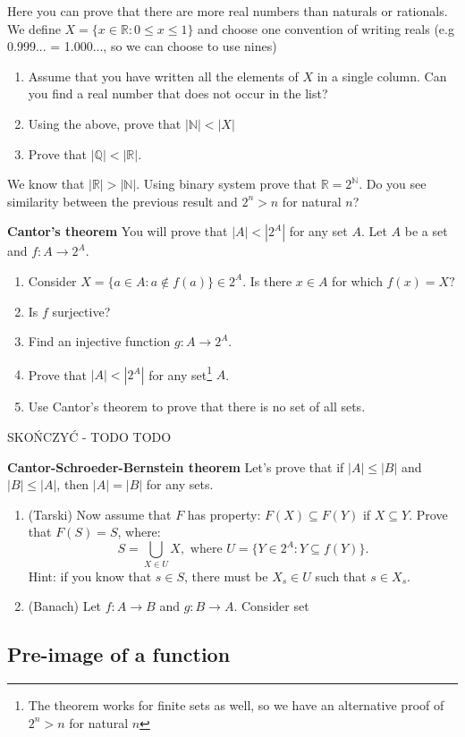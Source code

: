 \begin{prob}
	Here you can prove that there are more real numbers than naturals or rationals. We define $X=\{x\in \mathbb R : 0\le x\le 1\}$ and choose one
	 convention of writing reals (e.g 0.999... = 1.000..., so we can choose to use nines)   
	\begin{enumerate}
		\item Assume that you have written all the elements of $X$ in a single column. Can you find a real number that does not occur in the list? 
		\item Using the above, prove that $|\mathbb N| < |X|$
		\item Prove that $|\mathbb Q| < |\mathbb R|.$
	\end{enumerate}
\end{prob}

\begin{prob}
	We know that $|\mathbb R| > |\mathbb N|.$ Using binary system prove that $\mathbb R=2^\mathbb N.$ Do you see similarity between the previous result
	and $2^n > n$ for natural $n$?
\end{prob}

\begin{prob}
	\textbf{Cantor's theorem} You will prove that $|A|<\left|2^A\right|$ for any set $A$. Let $A$ be a set and $f:A\to 2^A.$
	\begin{enumerate}
		\item Consider $X=\{a\in A : a\notin f(a)\}\in 2^A$. Is there $x\in A$ for which $f(x)=X?$
		\item Is $f$ surjective? 
		\item Find an injective function $g: A\to 2^A.$
		\item Prove that $|A| < |2^A|$ for any set\footnote{The theorem works for finite sets as well, so we have an alternative proof of
			$2^n>n$ for natural $n$} $A$.
		\item Use Cantor's theorem to prove that there is no set of all sets.
	\end{enumerate}
\end{prob}

SKOŃCZYĆ - TODO TODO

\begin{prob}
	\textbf{Cantor-Schroeder-Bernstein theorem} Let's prove that if $|A|\le|B|$ and $|B|\le |A|$, then $|A|=|B|$ for any sets.
	\begin{enumerate}
		\item (Tarski) Now assume that $F$ has property: $F(X)\subseteq F(Y)$ if $X\subseteq Y$. Prove that $F(S)=S$, where:
			$$S=\bigcup_{X\in U} X, \text{~where~} U= \{Y\in 2^A : Y\subseteq f(Y)\}.$$
			Hint: if you know that $s\in S$, there must be $X_s\in U$ such that $s\in X_s.$
		\item (Banach) Let $f: A\to B$ and $g:B\to A$. Consider set
	\end{enumerate}
\end{prob}

\subsection{Pre-image of a function}

